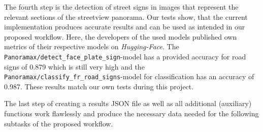 The fourth step is the detection of street signs in images that represent the
relevant sections of the streetview panorama. Our tests show, that the current
implementation produces accurate results and can be used as intended in our
proposed workflow. Here, the developers of the used models published own metrics
of their respective models on \textit{Hugging-Face}.
The \texttt{Panoramax/detect\_face\_plate\_sign}-model has a provided accuracy for
road signs of 0.879 which is still very high and the
\texttt{Panoramax/classify\_fr\_road\_signs}-model for classification has an
accuracy of 0.987. These results match our own tests during this project.

The last step of creating a results JSON file as well as all additional
(auxiliary) functions work flawlessly and produce the necessary data needed for
the following subtasks of the proposed workflow.


